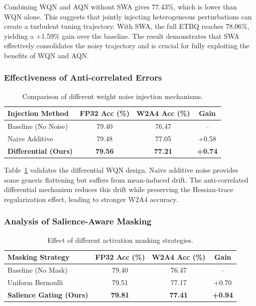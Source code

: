 \documentclass{article}
\begin{document}
Combining WQN and AQN without SWA gives 77.43\%, which is lower than WQN alone. This suggests that jointly injecting heterogeneous perturbations can create a turbulent tuning trajectory. With SWA, the full ETBQ reaches 78.06\%, yielding a +1.59\% gain over the baseline. The result demonstrates that SWA effectively consolidates the noisy trajectory and is crucial for fully exploiting the benefits of WQN and AQN.

\subsubsection{Effectiveness of Anti-correlated Errors}

\begin{table}[h]
\centering
\caption{Comparison of different weight noise injection mechanisms.}
\label{tab:ablation_differential}
\begin{tabular}{lccc}
\toprule
\textbf{Injection Method} & \textbf{FP32 Acc (\%)} & \textbf{W2A4 Acc (\%)} & \textbf{Gain} \\
\midrule
Baseline (No Noise)       & 79.40                  & 76.47                  & -- \\
Naive Additive            & 79.48                  & 77.05                  & +0.58 \\
\textbf{Differential (Ours)} & \textbf{79.56}      & \textbf{77.21}         & \textbf{+0.74} \\
\bottomrule
\end{tabular}
\end{table}

Table~\ref{tab:ablation_differential} validates the differential WQN design. Naive additive noise provides some generic flattening but suffers from mean-induced drift. The anti-correlated differential mechanism reduces this drift while preserving the Hessian-trace regularization effect, leading to stronger W2A4 accuracy.

\subsubsection{Analysis of Salience-Aware Masking}

\begin{table}[h]
\centering
\caption{Effect of different activation masking strategies.}
\label{tab:ablation_masking}
\begin{tabular}{lccc}
\toprule
\textbf{Masking Strategy} & \textbf{FP32 Acc (\%)} & \textbf{W2A4 Acc (\%)} & \textbf{Gain} \\
\midrule
Baseline (No Mask)        & 79.40                  & 76.47                  & -- \\
Uniform Bernoulli         & 79.51                  & 77.17                  & +0.70 \\
\textbf{Salience Gating (Ours)} & \textbf{79.81}   & \textbf{77.41}         & \textbf{+0.94} \\
\bottomrule
\end{tabular}
\end{table}
\end{document}
